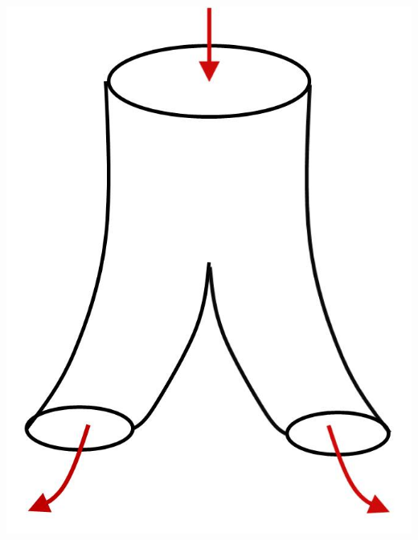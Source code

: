 \documentclass[a4paper,11pt,notitlepage]{report}
\begin{document}
\includegraphics[scale=0.4]{images/Stringtheorie.jpg}
\end{document}
